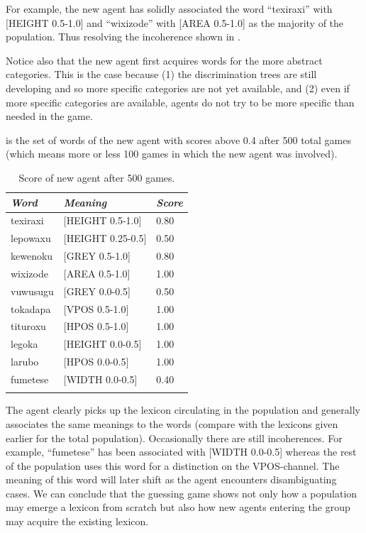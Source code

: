 For example, the new agent
has solidly associated the word ``texiraxi'' with 
{}[HEIGHT 0.5-1.0] and ``wixizode'' with [AREA 0.5-1.0]
as the majority of the population. Thus resolving the 
incoherence shown in . 

Notice also that the new agent first acquires words 
for the more abstract categories. This is the case 
because (1) the discrimination trees are still developing
and so more specific categories are not yet available, 
and (2) even if more specific categories are available, 
agents do not try to be more specific than needed in 
the game. 

 is the set of words of the new agent
with scores above 0.4 after 
500 total games (which means more or less 100 games 
in which the new agent was involved). 


\begin{table}
\begin{center}
\begin{tabular}{ l  l  l }
\lsptoprule
{\itshape Word} & {\itshape Meaning} & {\itshape Score} \\ \midrule
texiraxi &  [HEIGHT 0.5-1.0] & 0.80 \\ 
lepowaxu &  [HEIGHT 0.25-0.5] & 0.50 \\ 
kewenoku &  [GREY 0.5-1.0] & 0.80 \\ 
wixizode & [AREA 0.5-1.0] & 1.00 \\ 
vuwusugu & [GREY 0.0-0.5] & 0.50 \\ 
tokadapa &  [VPOS 0.5-1.0] & 1.00 \\ 
tituroxu &  [HPOS 0.5-1.0] & 1.00 \\ 
legoka   &  [HEIGHT 0.0-0.5] & 1.00 \\ 
larubo   &  [HPOS 0.0-0.5] & 1.00 \\ 
fumetese &  [WIDTH 0.0-0.5] & 0.40 \\ 
\lspbottomrule
\end{tabular}
\caption{\label{tab:newagents} Score of new agent after 500 games.}
\end{center}
\end{table}
The agent clearly picks up the lexicon circulating
in the population and generally associates the 
same meanings to the words (compare with the 
lexicons given earlier for the total population). 
Occasionally there are still incoherences. For example, 
``fumetese'' has been associated with [WIDTH 0.0-0.5] 
whereas the rest of the population uses this word
for a distinction on the VPOS-channel. The meaning
of this word will later shift as the agent encounters
disambiguating cases. We can conclude that the 
guessing game shows not only how a population may 
emerge a lexicon from scratch but also how new 
agents entering the group may acquire the existing 
lexicon.  

